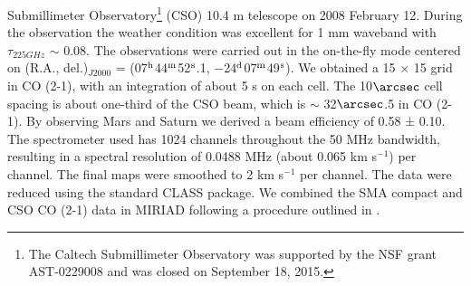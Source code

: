 Submillimeter Observatory\footnote{    The Caltech Submillimeter Observatory was supported by the NSF grant
AST-0229008 and was closed on September 18, 2015.} (CSO) 10.4 m telescope on 2008 February 12. During the observation the weather condition was excellent for 1 mm waveband with $\tau_{225GHz}$ $\sim$ 0.08. The observations were carried out in the on-the-fly mode centered on (R.A., del.)$_{J2000}$ = (07$^\textup{h}$44$^\textup{m}$52$^\textup{s}$.1, −24$^\textup{d}$07$^\textup{m}$49$^\textup{s}$). We obtained a 15 × 15 grid in CO (2-1), with an integration of about 5 s on each cell. The 10${\arcsec}$ cell spacing is about one-third of the CSO beam, which is $\sim$ 32${\arcsec}$.5 in CO (2-1). By observing Mars and Saturn we derived a beam efficiency of 0.58 ± 0.10. The spectrometer used has 1024 channels throughout the 50 MHz bandwidth, resulting in a spectral resolution of 0.0488 MHz (about 0.065 km s$^{-1}$) per channel. The final maps were smoothed to 2 km s$^{-1}$ per channel. The data were reduced using the standard CLASS package. We combined the SMA compact and CSO CO (2-1) data in MIRIAD following a procedure outlined in \citet{1995ApJ...451L..71Z}. 